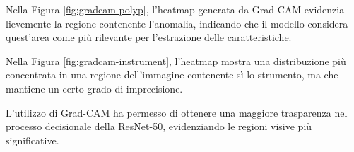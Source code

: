 \documentclass[../main.tex]{subfiles}
\begin{document}
Nella Figura \ref{fig:gradcam-polyp}, l'heatmap generata da Grad-CAM evidenzia lievemente la regione contenente l'anomalia, indicando che il modello considera quest'area come più rilevante per l'estrazione delle caratteristiche.

Nella Figura \ref{fig:gradcam-instrument}, l'heatmap mostra una distribuzione più concentrata in una regione dell'immagine contenente sì lo strumento, ma che mantiene un certo grado di imprecisione.

L'utilizzo di Grad-CAM ha permesso di ottenere una maggiore trasparenza nel processo decisionale della ResNet-50, evidenziando le regioni visive più significative. 
\end{document}
